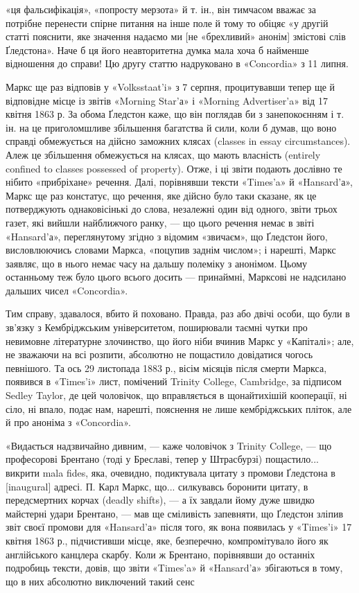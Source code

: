 \parcont{}  %
«ця фальсифікація», «попросту мерзота» й т. ін., він тимчасом
вважає за потрібне перенести спірне питання на інше поле й тому
то обіцяє «у другій статті пояснити, яке значення надаємо ми
[не «брехливий» анонім] змістові слів Ґледстона». Наче б ця
його неавторитетна думка мала хоча б найменше відношення до
справи! Цю другу статтю надруковано в «Concordia» з 11 липня.

Маркс ще раз відповів у «Volksstaat’i» з 7 серпня, процитувавши
тепер ще й відповідне місце із звітів «Morning Star’а» і
«Morning Advertiser’a» від 17 квітня 1863 р. За обома Ґледстон
каже, що він поглядав би з занепокоєнням і т. ін. на це приголомшливе
збільшення багатства й сили, коли б думав, що воно
справді обмежується на дійсно заможних клясах (classes in essay
circumstances). Алеж це збільшення обмежується на клясах,
що мають власність (entirely confined to classes possessed of
property). Отже, і ці звіти подають дослівно те нібито «прибріхане»
речення. Далі, порівнявши тексти «Times’a» й «Hansard’а»,
Маркс ще раз констатує, що речення, яке дійсно було
таки сказане, як це потверджують однаковісінькі до слова, незалежні
один від одного, звіти трьох газет, які вийшли найближчого
ранку, — що цього речення немає в звіті «Hansard’а», переглянутому
згідно з відомим «звичаєм», що Ґледстон його,
висловлюючись словами Маркса, «поцупив заднім числом»; і
нарешті, Маркс заявляє, що в нього немає часу на дальшу полеміку
з анонімом. Цьому останньому теж було цього всього досить —
принаймні, Марксові не надсилано дальших чисел «Concordia».

Тим справу, здавалося, вбито й поховано. Правда, раз або
двічі особи, що були в зв’язку з Кембріджським університетом,
поширювали таємні чутки про невимовне літературне злочинство,
що його ніби вчинив Маркс у «Капіталі»; але, не зважаючи на
всі розпити, абсолютно не пощастило довідатися чогось певнішого.
Та ось 29 листопада 1883 р., вісім місяців після смерти
Маркса, появився в «Times’i» лист, помічений Trinity College,
Cambridge, за підписом Sedley Taylor, де цей чоловічок, що вправляється
в щонайтихішій кооперації, ні сіло, ні впало, подає нам,
нарешті, пояснення не лише кембріджських пліток, але й про
аноніма з «Concordia».

«Видається надзвичайно дивним, — каже чоловічок з Trinity
College, — що професорові Брентано (тоді у Бреславі, тепер у
Штрасбурзі) пощастило... викрити mala fides, яка, очевидно,
подиктувала цитату з промови Ґледстона в [inaugural] адресі.
П. Карл Маркс, що... силкувавсь боронити цитату, в передсмертних
корчах (deadly shifts), — а їх завдали йому дуже швидко
майстерні удари Брентано, — мав ще сміливість запевняти, що
Ґледстон зліпив звіт своєї промови для «Hansard’а» після того,
як вона появилась у «Times’i» 17 квітня 1863 р., підчистивши
місце, яке, безперечно, компромітувало його як англійського
канцлера скарбу. Коли ж Брентано, порівнявши до останніх
подробиць тексти, довів, що звіти «Times’a» й «Hansard’а» збігаються
в тому, що в них абсолютно виключений такий сенс
\parbreak{}  %
